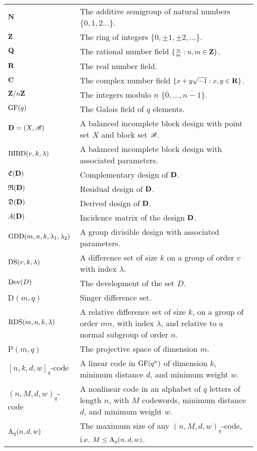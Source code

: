 \documentclass[../../main]{subfiles}
\begin{document}
 
 \begin{longtabu} to \textwidth{X[1,l] X[2,l]} %
 $\mathbf{N}$ & The additive semigroup of natural numbers $\{0,1,2\dots$\}. \\
 $\mathbf{Z}$ & The ring of integers $\{0, \pm1, \pm2, \dots$\}. \\
 $\mathbf{Q}$ & The rational number field $\{\frac{n}{m} : n,m \in \mathbf{Z}\}$. \\
 $\mathbf{R}$ & The real number field. \\
 $\mathbf{C}$ & The complex number field $\{x+y\sqrt{-1} : x,y \in \mathbf{R}\}$. \\
 $\mathbf{Z}/n\mathbf{Z}$ & The integers modulo $n$ $\{\overline{0}, \dots, \overline{n-1}\}$. \\
 $\text{GF}(q)$ & The Galois field of $q$ elements. \\
 $\mathbf{D}=(X,\mathscr{B})$ & A balanced incomplete block design with point set $X$ and block set $\mathscr{B}$. \\
 $\text{BIBD}(v,k,\lambda)$ & A balanced incomplete block design with associated parameters. \\
 $\mathfrak{C}(\mathbf{D})$ & Complementary design of $\mathbf{D}$. \\
 $\mathfrak{R}(\mathbf{D})$ & Residual design of $\mathbf{D}$. \\
 $\mathfrak{D}(\mathbf{D})$ & Derived design of $\mathbf{D}$. \\
 $A(\mathbf{D})$ & Incidence matrix of the design $\mathbf{D}$. \\
 $\text{GDD}(m,n,k,\lambda_1,\lambda_2)$ & A group divisible design with associated parameters. \\
 $\text{DS}(v,k,\lambda)$ & A difference set of size $k$ on a group of order $v$ with index $\lambda$. \\
 $\text{Dev}(D)$ & The development of the set $D$. \\
 D$(m,q)$ & Singer difference set. \\
 $\text{RDS}(m,n,k,\lambda)$ & A relative difference set of size $k$, on a group of order $mn$, with index $\lambda$, and relative to a normal subgroup of order $n$. \\
 P$(m,q)$ & The projective space of dimension $m$. \\
 $[n,k,d,w]_q$-code & A linear code in $\text{GF}(q^n)$ of dimension $k$, minimum distance $d$, and minimum weight $w$. \\
 $(n,M,d,w)_q$-code & A nonlinear code in an alphabet of $q$ letters of length $n$, with $M$ codewords, minimum distance $d$, and minimum weight $w$. \\
 $\text{A}_q(n,d,w)$ & The maximum size of any $(n,M,d,w)_q$-code, i.e. $M \leq \text{A}_q(n,d,w)$. \\

\end{longtabu}
\end{document}
